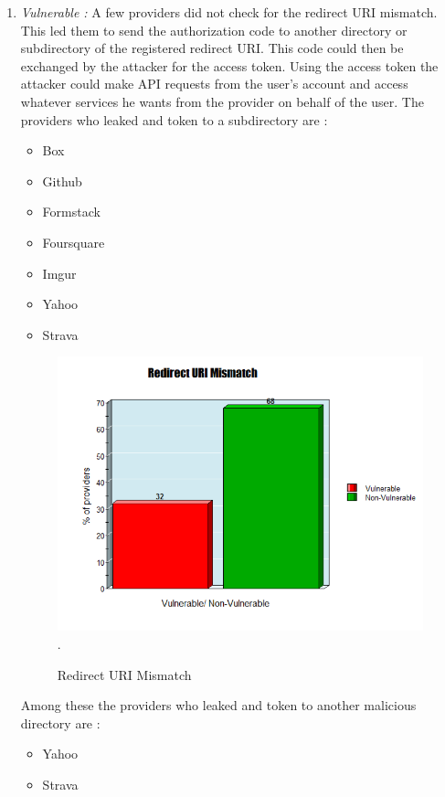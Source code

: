 \begin{enumerate}[label=(\Alph*)]
\item \textit{Vulnerable :}  A few providers did not check for the redirect URI mismatch. This led them to send the authorization code to another directory or subdirectory of the registered redirect URI. This code could then be exchanged by the attacker for the access token. Using the access token the attacker could make API requests from the user's account and access whatever services he wants from the provider on behalf of the user.
The providers who leaked and token to a subdirectory are :
\begin{itemize}
\item Box
\item Github
\item Formstack
\item Foursquare
\item Imgur
\item Yahoo
\item Strava
\end{itemize}

\begin{figure}[t]
   		 \centering
   		 \includegraphics[width=\columnwidth]{figures/redirectstats.png}.
   		 \caption{Redirect URI Mismatch}
   		 \label{fig:statsredirect}
\end{figure}
	
	
Among these the providers who leaked and token to another malicious directory are :
\begin{itemize}
\item Yahoo
\item Strava
\end{itemize}


\end{enumerate}
